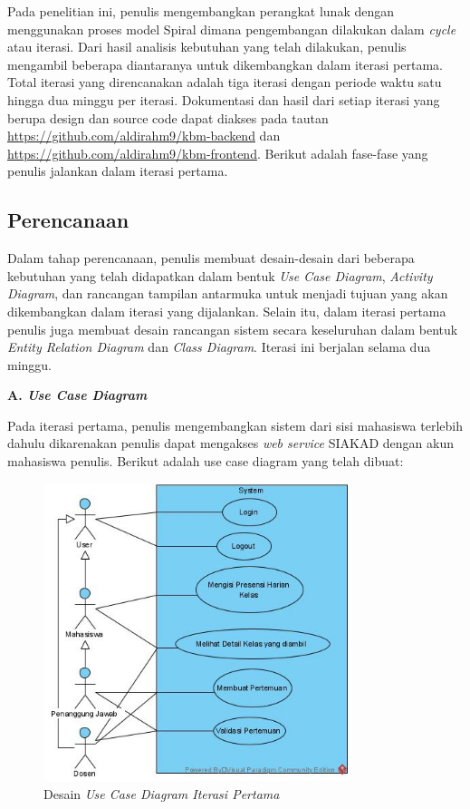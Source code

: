 Pada penelitian ini, penulis mengembangkan perangkat lunak dengan menggunakan proses model Spiral dimana pengembangan dilakukan dalam \emph{cycle} atau iterasi. Dari hasil analisis kebutuhan yang telah dilakukan, penulis mengambil beberapa diantaranya untuk dikembangkan dalam iterasi pertama. Total iterasi yang direncanakan adalah tiga iterasi dengan periode waktu satu hingga dua minggu per iterasi. Dokumentasi dan hasil dari setiap iterasi yang berupa design dan source code dapat diakses pada tautan \url{https://github.com/aldirahm9/kbm-backend} dan \url{https://github.com/aldirahm9/kbm-frontend}. Berikut adalah fase-fase yang penulis jalankan dalam iterasi pertama.


\subsection{Perencanaan}

Dalam tahap perencanaan, penulis membuat desain-desain dari beberapa kebutuhan yang telah didapatkan dalam bentuk \textit{Use Case Diagram}, \textit{Activity Diagram}, dan rancangan tampilan antarmuka untuk menjadi tujuan yang akan dikembangkan dalam iterasi yang dijalankan. Selain itu, dalam iterasi pertama penulis juga membuat desain rancangan sistem secara keseluruhan dalam bentuk \textit{Entity Relation Diagram} dan \textit{Class Diagram}. Iterasi ini berjalan selama dua minggu.

\textbf{A. \textit{Use Case Diagram}}

Pada iterasi pertama, penulis mengembangkan sistem dari sisi mahasiswa terlebih dahulu dikarenakan penulis dapat mengakses \textit{web service} SIAKAD dengan akun mahasiswa penulis. Berikut adalah use case diagram yang telah dibuat:

\begin{figure}[h!]
	\centering
	\includegraphics[width=0.8\textwidth]{gambar/diagram/Use Case Iteration 1}
	\caption{Desain \textit{Use Case Diagram Iterasi Pertama}}
	\label{fig:usecase1st}
\end{figure}

